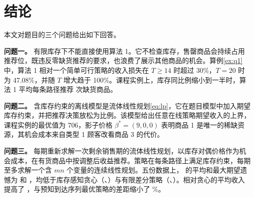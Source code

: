 \section{结论}\label{sec:conclusion}
本文对题目的三个问题给出如下回答。

\textbf{问题一。} 有限库存下不能直接使用算法 1。它不检查库存，售罄商品会持续占用推荐位，既违反零缺货推荐的要求，也浪费了展示其他商品的机会。算例\ref{ex:q1}中，算法 1 相对一个简单可行策略的收入损失在 $T\ge14$ 时超过 30\%，$T=20$ 时为 47.08\%，并随 $T$ 增大趋于 100\%。课程实例上，库存同比例缩小到一半时，算法 1 平均每条路径推荐 \ThetaHalfW{} 次缺货商品。

\textbf{问题二。} 含库存约束的离线模型是流体线性规划\eqref{eq:lp}，它在题目模型中加入期望库存约束，并把推荐决策放松为比例。该模型给出任意在线策略期望收入的上界，课程实例的最优值为 706，影子价格 $\beta^{*}=(9,0,0)$ 表明商品 1 是唯一的稀缺资源，其机会成本来自类型 1 顾客改看商品 3 的代价。

\textbf{问题三。} \LPDual{} 每期重新求解一次剩余销售期的流体线性规划，以库存对偶价格作为机会成本，在有货商品中按调整后收益推荐。策略在每条路径上满足库存约束，每期至多求解一个含 $mn$ 个变量的连续线性规划。五份数据上，\LPDual{} 的平均和最大期望遗憾为 \GavgDual{} 和 \GmaxDual，均低于库存感知贪心（\GavgGreedy、\GmaxGreedy）与有限差分策略（\GavgFD、\GmaxFD）。相对贪心的平均收入提高了 \DualGreedyAvg{}，与预知到达序列最优策略的差距缩小了 \DualSeqGapReductionPct\%。

